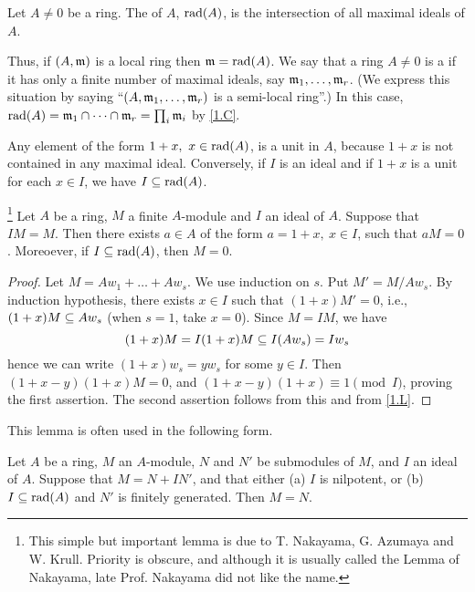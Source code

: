\documentclass[../main]{subfiles}
\begin{document}
\begin{pardefinition}
Let $A\ne0$ be a ring. The  of $A$, $\operatorname{rad}(A)$, is the intersection of all maximal ideals of $A$.
\end{pardefinition}

Thus, if $(A,\mathfrak{m})$ is a local ring then $\mathfrak{m}=\operatorname{rad}(A)$. We say that a ring $A\ne0$ is a  if it has only a finite number of maximal ideals, say $\mathfrak{m}_1,\dots,\mathfrak{m}_r$. (We express this situation by saying ``$(A,\mathfrak{m}_1,\dots,\mathfrak{m}_r)$ is a semi-local ring''.) In this case, $\operatorname{rad}(A)=\mathfrak{m}_1\cap\dots\cap\mathfrak{m}_r=\prod_i\mathfrak{m}_i$ by \ref{1.C}.

Any element of the form $1+x,~x\in\operatorname{rad}(A)$, is a unit in $A$, because $1+x$ is not contained in any maximal ideal. Conversely, if $I$ is an ideal and if $1+x$ is a unit for each $x\in I$, we have $I\subseteq\operatorname{rad}(A)$.

\begin{parlemma}[NAK]\label{lem:01.03}\label{NAK}\footnote{This simple but important lemma is due to T. Nakayama, G. Azumaya and W. Krull. Priority is obscure, and although it is usually called the Lemma of Nakayama, late Prof. Nakayama did not like the name.}
Let $A$ be a ring, $M$ a finite $A$-module and $I$ an ideal of $A$. Suppose that $IM=M$. Then there exists $a\in A$ of the form $a=1+x,~x\in I$, such that $aM=0$. Moreoever, if $I\subseteq\operatorname{rad}(A)$, then $M=0$.
\end{parlemma}

\begin{proof}
Let $M=Aw_1+\ldots+Aw_s$. We use induction on $s$. Put $M'=M/Aw_s$. By induction hypothesis, there exists $x\in I$ such that $(1+x)M'=0$, i.e., \newline $(1+x)M\subseteq Aw_s$ (when $s=1$, take $x=0$). Since $M=IM$, we have
\[(1+x)M = I(1+x)M \subseteq I(Aw_s) = Iw_s\]
hence we can write $(1+x)w_s=yw_s$ for some $y\in I$. Then $(1+x-y)(1+x)M=0$, and $(1+x-y)(1+x)\equiv 1\pmod{I}$, proving the first assertion. The second assertion follows from this and from \ref{1.L}.
\end{proof}

This lemma is often used in the following form.

\begin{corollary}\label{cor:01.01}
Let $A$ be a ring, $M$ an $A$-module, $N$ and $N'$ be submodules of $M$, and $I$ an ideal of $A$. Suppose that $M=N+IN'$, and that either (a) $I$ is nilpotent, or (b) $I\subseteq\operatorname{rad}(A)$ and $N'$ is finitely generated. Then $M=N$.
\end{corollary}
\end{document}
